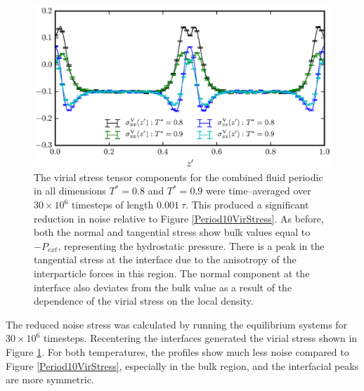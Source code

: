 \begin{figure}[h!]
\centering
\includegraphics[scale=1.0]{Period30VirStress}
\caption{The virial stress tensor components for the combined fluid periodic in all dimensions $T^{*} = 0.8$ and $T^{*} = 0.9$ were time--averaged over $30 \times 10^{6}$ timesteps of length $0.001\ \tau$.
This produced a significant reduction in noise relative to Figure \ref{Period10VirStress}.
As before, both the normal and tangential stress show bulk values equal to $-P_{ext}$, representing the hydrostatic pressure.
There is a peak in the tangential stress at the interface due to the anisotropy of the interparticle forces in this region.
The normal component at the interface also deviates from the bulk value as a result of the dependence of the virial stress on the local density.
}
\label{Period30VirStress}
\end{figure}

The reduced noise stress was calculated by running the equilibrium systems for $30 \times 10^{6}$ timesteps.
Recentering the interfaces generated the virial stress shown in Figure \ref{Period30VirStress}.
For both temperatures, the profiles show much less noise compared to Figure \ref{Period10VirStress}, especially in the bulk region, and the interfacial peaks are more symmetric.
\FloatBarrier

